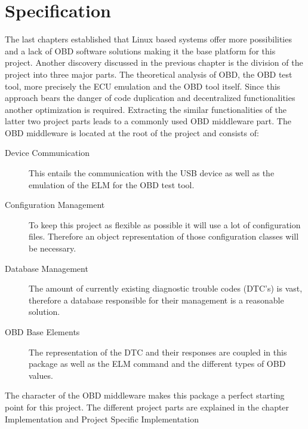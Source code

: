 

\chapter{Specification}
The last chapters established that Linux based systems offer more possibilities and a lack of OBD software solutions making it the base platform for 
this project. Another discovery discussed in the previous chapter is the division of the project into three major parts. The theoretical analysis of 
OBD, the OBD test tool, more precisely the ECU emulation and the OBD tool itself. Since this approach bears the danger of code duplication and 
decentralized functionalities another optimization is required.  Extracting the similar functionalities of the latter two project parts leads to a 
commonly used OBD middleware part. 
The OBD middleware is located at the root of the project and consists of:
\begin{description}
\item[Device Communication]

This entails the communication with the USB device as well as the emulation of the ELM for the OBD test tool.
\item[Configuration Management]

To keep this project as flexible as possible it will use a lot of configuration files. Therefore an object representation of those configuration 
classes will be necessary.
\item[Database Management]

The amount of currently existing diagnostic trouble codes (DTC’s) is vast, therefore a database responsible for their management is a reasonable 
solution.
\item[OBD Base Elements]

The representation of the DTC and their responses are coupled in this package as well as the ELM command and the different types of OBD values.
\end{description}

The character of the OBD middleware makes this package a perfect starting point for this project. 
The different project parts are explained in the chapter Implementation and Project Specific Implementation

\setcounter{subsection}{0}
